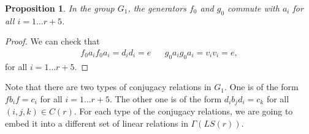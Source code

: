 \documentclass[11pt,letterpaper]{article}
\newcommand{\1}{\mathbb{1}}
\newcommand{\LS}{LS}
\newtheorem{proposition}[theorem]{Proposition}
\theoremstyle{definition}
\begin{document}
\begin{proposition}
	In the group $G_1$, the generators $f_0$ and $g_0$ commute with $a_i$ for all $i = 1 \dots r+5$.
\end{proposition}
\begin{proof}
	We can check that
	\begin{align*}
		f_0a_i f_0 a_i = d_i d_i = e && g_0 a_i g_0 a_i = v_i v_i  = e,
	\end{align*}
	for all $i = 1 \dots r+5$.
\end{proof}
Note that there are two types of conjugacy relations in $G_1$. One is of the form
$f b_i f = c_i$ for all $i = 1 \dots r+5$. The other one is of the form 
$d_ib_jd_i = c_k$ for all $(i,j,k) \in C(r)$. For each type of the conjugacy relations, 
we are going to embed it into a different set of linear relations in $\Gamma(\LS(r))$.
\end{document}
